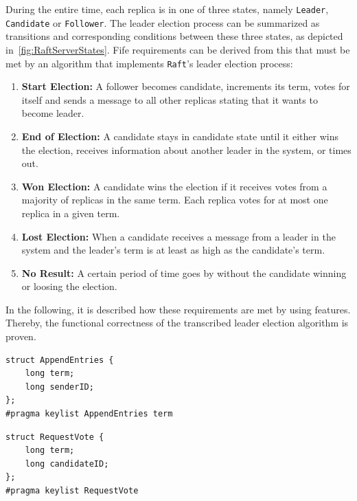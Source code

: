 During the entire time, each replica is in one of three states, namely \texttt{Leader}, \texttt{Candidate} or \texttt{Follower}.
The leader election process can be summarized as transitions and corresponding conditions between these three states, as depicted in~\autoref{fig:RaftServerStates}.
Fife requirements can be derived from this that must be met by an algorithm that implements \texttt{Raft}'s leader election process:

\begin{enumerate}
\item \textbf{Start Election:} A follower becomes candidate, increments its term, votes for itself and sends a message to all other replicas stating that it wants to become leader.
\item \textbf{End of Election:} A candidate stays in candidate state until it either wins the election, receives information about another leader in the system, or times out.
\item \textbf{Won Election:} A candidate wins the election if it receives votes from a majority of replicas in the same term. Each replica votes for at most one replica in a given term.
\item \textbf{Lost Election:} When a candidate receives a message from a leader in the system and the leader's term is at least as high as the candidate's term.
\item \textbf{No Result:} A certain period of time goes by without the candidate winning or loosing the election.
\end{enumerate}
In the following, it is described how these requirements are met by using  features.
Thereby, the functional correctness of the transcribed leader election algorithm is proven.

\lstset{language=C}
\begin{lstlisting}[caption={\abr{IDL} definition for the \texttt{AppendEntries} topic. The \texttt{term} variable represents the latest term that the replica has seen, while the \texttt{senderID} encodes which replica sent this message.}, label=code:appendEntries]
struct AppendEntries {
    long term;
    long senderID;
};
#pragma keylist AppendEntries term
\end{lstlisting}

\begin{lstlisting}[caption={\abr{IDL} definition for the \texttt{RequestVote} topic. The \texttt{term} variable represents the candidate's term, while \texttt{candidateID} encodes the candidate that requested the vote.}, label=code:requestVote]
struct RequestVote {
    long term;
    long candidateID;
};
#pragma keylist RequestVote
\end{lstlisting}

